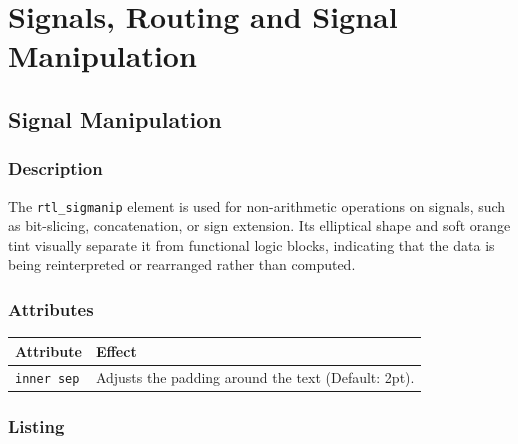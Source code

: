 \chapter{\sffamily Signals, Routing and Signal Manipulation}

\section{\sffamily Signal Manipulation}

    \subsection{\sffamily Description}
        The \texttt{rtl\_sigmanip} element is used for non-arithmetic operations on signals, such as bit-slicing, concatenation, or sign extension. Its elliptical shape and soft orange tint visually separate it from functional logic blocks, indicating that the data is being reinterpreted or rearranged rather than computed.

    \subsection{\sffamily Attributes}
    \begin{center}
        \begin{tabular}{lp{8cm}}
        \toprule
            \textbf{Attribute} & \textbf{Effect} \\
            \midrule
            \texttt{inner sep} & Adjusts the padding around the text (Default: 2pt). \\
            \bottomrule
        \end{tabular}
    \end{center}

    \subsection{\sffamily Listing}
\begin{RTLexample}
\end{RTLexample}

